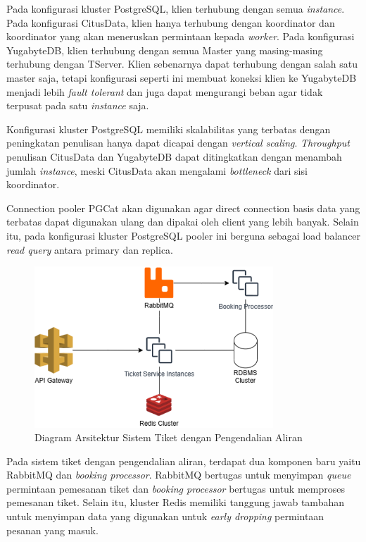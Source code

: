 Pada konfigurasi kluster PostgreSQL, klien terhubung dengan semua \textit{instance}. Pada konfigurasi CitusData, klien hanya terhubung dengan koordinator dan koordinator yang akan meneruskan permintaan kepada \textit{worker}. Pada konfigurasi YugabyteDB, klien terhubung dengan semua Master yang masing-masing terhubung dengan TServer. Klien sebenarnya dapat terhubung dengan salah satu master saja, tetapi konfigurasi seperti ini membuat koneksi klien ke YugabyteDB menjadi lebih \textit{fault tolerant} dan juga dapat mengurangi beban agar tidak terpusat pada satu \textit{instance} saja.

Konfigurasi kluster PostgreSQL memiliki skalabilitas yang terbatas dengan peningkatan penulisan hanya dapat dicapai dengan \textit{vertical scaling}. \textit{Throughput} penulisan CitusData dan YugabyteDB dapat ditingkatkan dengan menambah jumlah \textit{instance}, meski CitusData akan mengalami \textit{bottleneck} dari sisi koordinator.

Connection pooler PGCat akan digunakan agar direct connection basis data yang terbatas dapat digunakan ulang dan dipakai oleh client yang lebih banyak. Selain itu, pada konfigurasi kluster PostgreSQL pooler ini berguna sebagai load balancer \textit{read query} antara primary dan replica.

\begin{figure}[htbp]
    \centering
    \includegraphics[width=0.8\textwidth]{resources/chapter-3/ticket-fc.png}
    \caption{Diagram Arsitektur Sistem Tiket dengan Pengendalian Aliran}
    \label{fig:ticket-fc}
\end{figure}

Pada sistem tiket dengan pengendalian aliran, terdapat dua komponen baru yaitu RabbitMQ dan \textit{booking processor}. RabbitMQ bertugas untuk menyimpan \textit{queue} permintaan pemesanan tiket dan \textit{booking processor} bertugas untuk memproses pemesanan tiket. Selain itu, kluster Redis memiliki tanggung jawab tambahan untuk menyimpan data yang digunakan untuk \textit{early dropping} permintaan pesanan yang masuk.

